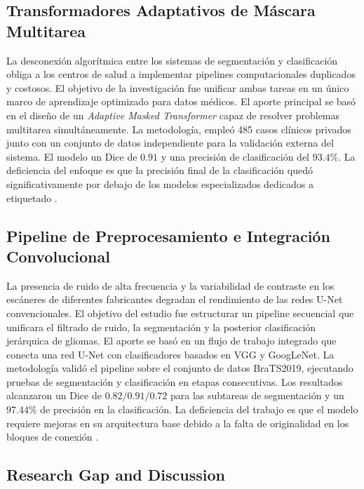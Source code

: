 \subsection{Transformadores Adaptativos de Máscara Multitarea}
La desconexión algorítmica entre los sistemas de segmentación y clasificación obliga a los centros de salud a implementar pipelines computacionales duplicados y costosos. El objetivo de la investigación fue unificar ambas tareas en un único marco de aprendizaje optimizado para datos médicos. El aporte principal se basó en el diseño de un \textit{Adaptive Masked Transformer} capaz de resolver problemas multitarea simultáneamente. La metodología, empleó 485 casos clínicos privados junto con un conjunto de datos independiente para la validación externa del sistema. El modelo un Dice de $0.91$ y una precisión de clasificación del $93.4\%$. La deficiencia del enfoque es que la precisión final de la clasificación quedó significativamente por debajo de los modelos especializados dedicados a etiquetado \cite{Lv2025}.

\subsection{Pipeline de Preprocesamiento e Integración Convolucional}
La presencia de ruido de alta frecuencia y la variabilidad de contraste en los escáneres de diferentes fabricantes degradan el rendimiento de las redes U-Net convencionales. El objetivo del estudio fue estructurar un pipeline secuencial que unificara el filtrado de ruido, la segmentación y la posterior clasificación jerárquica de gliomas. El aporte se basó en un flujo de trabajo integrado que conecta una red U-Net con clasificadores basados en VGG y GoogLeNet. La metodología validó el pipeline sobre el conjunto de datos BraTS2019, ejecutando pruebas de segmentación y clasificación en etapas consecutivas. Los resultados alcanzaron un Dice de $0.82 / 0.91 / 0.72$ para las subtareas de segmentación y un $97.44\%$ de precisión en la clasificación. La deficiencia del trabajo es que el modelo requiere mejoras en su arquitectura base debido a la falta de originalidad en los bloques de conexión \cite{Dang2022}.

\subsection{Research Gap and Discussion}
\label{subsec:research_gap}

